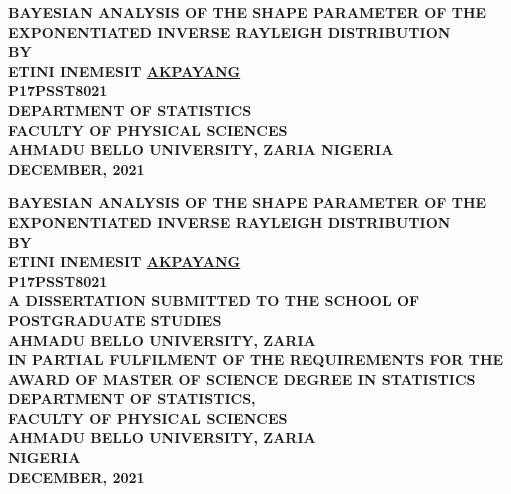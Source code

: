 \documentclass[a4paper,12pt]{report}
\begin{document}
\rmfamily

\newpage
{}
\begin{titlepage}
	\centering
	\large{\textbf{BAYESIAN ANALYSIS OF THE SHAPE PARAMETER OF THE EXPONENTIATED INVERSE RAYLEIGH DISTRIBUTION}}\vspace{3cm}\\
	\textbf{BY}\vspace{3cm}\\
	\textbf{\textbf{ETINI INEMESIT \underline{AKPAYANG}}}\\
	\textbf{P17PSST8021}\vspace{5cm}\\
	\textbf{DEPARTMENT OF STATISTICS\\
	FACULTY OF PHYSICAL SCIENCES\\
	AHMADU BELLO UNIVERSITY, ZARIA NIGERIA\vspace{3cm}\\
	DECEMBER, 2021}
\end{titlepage}

\newpage 
{}
\begin{center}
	
	
\end{center}

\newpage
{}
\begin{center}	
\textbf{BAYESIAN ANALYSIS OF THE SHAPE PARAMETER OF THE EXPONENTIATED INVERSE RAYLEIGH DISTRIBUTION} \vspace{2cm}\\
\textbf{BY}\vspace{2cm}\\
\textbf{\textbf{ETINI INEMESIT \underline{AKPAYANG}}}\\
\textbf{P17PSST8021}\vspace{3cm}\\

\textbf{A DISSERTATION SUBMITTED TO THE SCHOOL OF POSTGRADUATE STUDIES\\ AHMADU BELLO UNIVERSITY, ZARIA\vspace{1cm}\\
IN PARTIAL FULFILMENT OF THE REQUIREMENTS FOR THE AWARD OF MASTER OF SCIENCE DEGREE IN STATISTICS\vspace{1cm}\\
DEPARTMENT OF STATISTICS,\\
FACULTY OF PHYSICAL SCIENCES\\
AHMADU BELLO UNIVERSITY, ZARIA\\
NIGERIA\vspace{3cm}\\
	DECEMBER, 2021\\}
\end{center}
\end{document}
